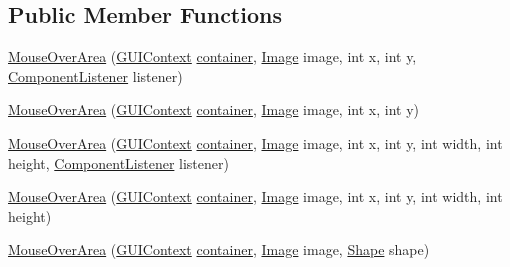 \subsection*{Public Member Functions}
\begin{DoxyCompactItemize}
\item 
\mbox{\hyperlink{classorg_1_1newdawn_1_1slick_1_1gui_1_1_mouse_over_area_aaaa48eb32df4f94d59c84fbb24604b1b}{Mouse\+Over\+Area}} (\mbox{\hyperlink{interfaceorg_1_1newdawn_1_1slick_1_1gui_1_1_g_u_i_context}{G\+U\+I\+Context}} \mbox{\hyperlink{classorg_1_1newdawn_1_1slick_1_1gui_1_1_abstract_component_af6d1abaa24da0b9a06fb153722e15435}{container}}, \mbox{\hyperlink{classorg_1_1newdawn_1_1slick_1_1_image}{Image}} image, int x, int y, \mbox{\hyperlink{interfaceorg_1_1newdawn_1_1slick_1_1gui_1_1_component_listener}{Component\+Listener}} listener)
\item 
\mbox{\hyperlink{classorg_1_1newdawn_1_1slick_1_1gui_1_1_mouse_over_area_aeb8e5f0254e9283a43a27b8b44b0b99f}{Mouse\+Over\+Area}} (\mbox{\hyperlink{interfaceorg_1_1newdawn_1_1slick_1_1gui_1_1_g_u_i_context}{G\+U\+I\+Context}} \mbox{\hyperlink{classorg_1_1newdawn_1_1slick_1_1gui_1_1_abstract_component_af6d1abaa24da0b9a06fb153722e15435}{container}}, \mbox{\hyperlink{classorg_1_1newdawn_1_1slick_1_1_image}{Image}} image, int x, int y)
\item 
\mbox{\hyperlink{classorg_1_1newdawn_1_1slick_1_1gui_1_1_mouse_over_area_a7b70096179bb4dd8bb9d71d135176841}{Mouse\+Over\+Area}} (\mbox{\hyperlink{interfaceorg_1_1newdawn_1_1slick_1_1gui_1_1_g_u_i_context}{G\+U\+I\+Context}} \mbox{\hyperlink{classorg_1_1newdawn_1_1slick_1_1gui_1_1_abstract_component_af6d1abaa24da0b9a06fb153722e15435}{container}}, \mbox{\hyperlink{classorg_1_1newdawn_1_1slick_1_1_image}{Image}} image, int x, int y, int width, int height, \mbox{\hyperlink{interfaceorg_1_1newdawn_1_1slick_1_1gui_1_1_component_listener}{Component\+Listener}} listener)
\item 
\mbox{\hyperlink{classorg_1_1newdawn_1_1slick_1_1gui_1_1_mouse_over_area_aa0a8353cce2f80c6c153740173274f0e}{Mouse\+Over\+Area}} (\mbox{\hyperlink{interfaceorg_1_1newdawn_1_1slick_1_1gui_1_1_g_u_i_context}{G\+U\+I\+Context}} \mbox{\hyperlink{classorg_1_1newdawn_1_1slick_1_1gui_1_1_abstract_component_af6d1abaa24da0b9a06fb153722e15435}{container}}, \mbox{\hyperlink{classorg_1_1newdawn_1_1slick_1_1_image}{Image}} image, int x, int y, int width, int height)
\item 
\mbox{\hyperlink{classorg_1_1newdawn_1_1slick_1_1gui_1_1_mouse_over_area_ac30e4573da9901acb8086a9015282a81}{Mouse\+Over\+Area}} (\mbox{\hyperlink{interfaceorg_1_1newdawn_1_1slick_1_1gui_1_1_g_u_i_context}{G\+U\+I\+Context}} \mbox{\hyperlink{classorg_1_1newdawn_1_1slick_1_1gui_1_1_abstract_component_af6d1abaa24da0b9a06fb153722e15435}{container}}, \mbox{\hyperlink{classorg_1_1newdawn_1_1slick_1_1_image}{Image}} image, \mbox{\hyperlink{classorg_1_1newdawn_1_1slick_1_1geom_1_1_shape}{Shape}} shape)

\end{DoxyCompactItemize}
